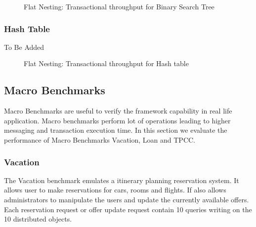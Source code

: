 \documentclass[12pt,english]{report}
\begin{document}
\begin{figure}[H]
\caption{Flat Nesting: Transactional throughput for Binary Search Tree}
\label{Fig:flatBst}
\end{figure}

\subsubsection{Hash Table}
To Be Added 

\begin{figure}[H]
\centering
{}
\qquad
{}
\end{figure}

\begin{figure}[H]
\caption{Flat Nesting: Transactional throughput for Hash table}
\label{Fig:flatHashTable}
\end{figure}

\subsection{Macro Benchmarks}

Macro Benchmarks are useful to verify the framework capability in real life application. Macro benchmarks perform lot of operations leading to higher messaging and transaction execution time. In this section we evaluate the performance of Macro Benchmarks Vacation, Loan and TPCC.

\subsubsection{Vacation}

The Vacation benchmark emulates a itinerary planning reservation system. It allows user to make reservations for cars, rooms and flights. If also allows administrators to manipulate the users and update the currently available offers. Each reservation request or offer update request contain 10 queries writing on the 10 distributed objects. 
\end{document}
